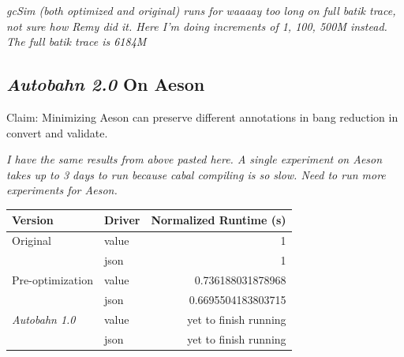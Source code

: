 \documentclass[format=sigplan]{acmart}
\newcommand{\Ao}[0]{\textit{Autobahn 1.0}}
\newcommand{\At}[0]{\textit{Autobahn 2.0}}
\begin{document}
\textit{gcSim (both optimized and original) runs for waaaay too long on full batik trace, not sure how Remy did it. Here I'm doing increments of 1, 100, 500M instead. The full batik trace is 6184M}
 
\subsection{\At{} On Aeson}
 
Claim: Minimizing Aeson can preserve different annotations in bang reduction in convert and validate.

\textit{I have the same results from above pasted here. A single experiment on Aeson takes up to 3 days to run because cabal compiling is so slow. Need to run more experiments for Aeson.}

\begin{tabular}{llr}
\hline
Version   & Driver & Normalized Runtime (s) \\
\hline
Original      & value   & 1     \\
          & json        & 1      \\
Pre-optimization       & value     & 0.736188031878968     \\
          & json        & 0.6695504183803715	\\
\Ao{}       & value     & yet to finish running      \\
          & json        & yet to finish running	\\

\hline
\end{tabular}
\end{document}
